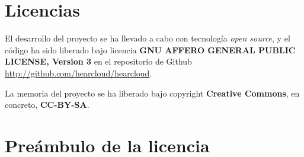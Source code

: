 \section{Licencias}
\label{sec:licencias}

El desarrollo del proyecto se ha llevado a cabo con tecnología \textit{open source}, y el código ha sido liberado bajo licencia \textbf{GNU AFFERO GENERAL PUBLIC LICENSE, Version 3} en el repositorio de Github \url{http://github.com/hearcloud/hearcloud}.

La memoria del proyecto se ha liberado bajo copyright \textbf{Creative Commons}, en concreto, \textbf{CC-BY-SA}.

\section{Preámbulo de la licencia}

